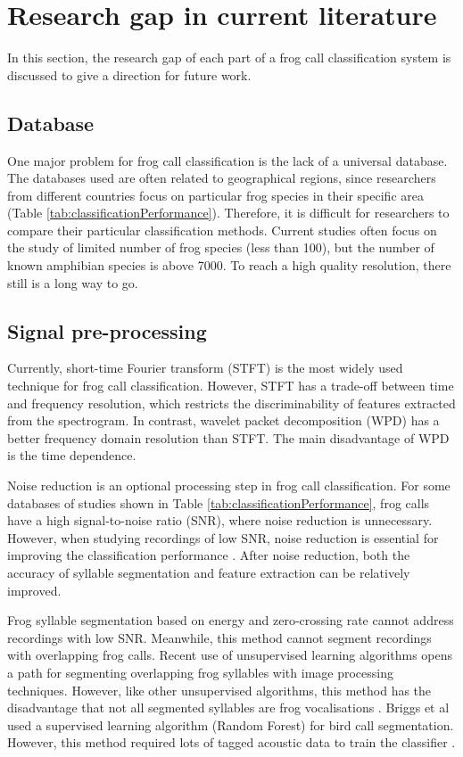  
\section{Research gap in current literature}
\label{discussion}
In this section, the research gap of each part of a frog call classification system is discussed to give a direction for future work. 

\subsection{Database}
One major problem for frog call classification is the lack of a universal database. The databases used are often related to geographical regions, since researchers from different countries focus on particular frog species in their specific area (Table \ref{tab:classificationPerformance}). Therefore, it is difficult for researchers to compare their particular classification methods. Current studies often focus on the study of limited number of frog species (less than 100), but the number of known amphibian species is above 7000. To reach a high quality resolution, there still is a long way to go.


\subsection{Signal pre-processing}
Currently, short-time Fourier transform (STFT) is the most widely used technique for frog call classification. However, STFT has a trade-off between time and frequency resolution, which restricts the discriminability of features extracted from the spectrogram. 
In contrast, wavelet packet decomposition (WPD) has a better frequency domain resolution than STFT. The main disadvantage of WPD is the time dependence. 

Noise reduction is an optional processing step in frog call classification. For some databases of studies shown in Table \ref{tab:classificationPerformance}, frog calls have a high signal-to-noise ratio (SNR), where noise reduction is unnecessary. However, when studying recordings of low SNR, noise reduction is essential for improving the classification performance \citep{bedoya2014automatic, Huang20141}. After noise reduction, both the accuracy of syllable segmentation and feature extraction can be relatively improved.

Frog syllable segmentation based on energy and zero-crossing rate cannot address recordings with low SNR. Meanwhile, this method cannot segment recordings with overlapping frog calls. Recent use of unsupervised learning algorithms opens a path for segmenting overlapping frog syllables with image processing techniques. However, like other unsupervised algorithms, this method has the disadvantage that not all segmented syllables are frog vocalisations \citep{potamitis2015unsupervised}. Briggs et al used a supervised learning algorithm (Random Forest) for bird call segmentation. However, this method required lots of tagged acoustic data to train the classifier \citep{tjahja2015supervised}.

